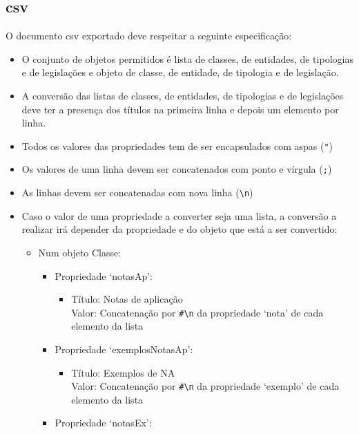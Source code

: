 \subsection{\acrshort{csv}}

O documento \acrshort{csv} exportado deve respeitar a seguinte especificação:
\begin{itemize}
    \item O conjunto de objetos permitidos é lista de classes, de entidades, de tipologias e de legislações e objeto de classe, de entidade, de tipologia e de legislação.
    \item A conversão das listas de classes, de entidades, de tipologias e de legislações deve ter a presença dos títulos na primeira linha e depois um elemento por linha.
    \item Todos os valores das propriedades tem de ser encapsulados com aspas (\verb|"|)
    \item Os valores de uma linha devem ser concatenados com ponto e vírgula (\verb|;|)
    \item As linhas devem ser concatenadas com nova linha (\verb|\n|)
    \item Caso o valor de uma propriedade a converter seja uma lista, a conversão a realizar irá depender da propriedade e do objeto que está a ser convertido: 
    \begin{itemize}
        \item Num objeto Classe:
        \begin{itemize}
            \item Propriedade `notasAp':
            \begin{itemize}
                \item Título: Notas de aplicação \\
                      Valor: Concatenação por \verb|#\n| da propriedade `nota' de cada elemento da lista
            \end{itemize}
            \item Propriedade `exemplosNotasAp':
            \begin{itemize}
                \item Título: Exemplos de NA \\
                      Valor: Concatenação por \verb|#\n| da propriedade `exemplo' de cada elemento da lista
            \end{itemize}
            \item Propriedade `notasEx':
            \begin{itemize}

\end{itemize}
\end{itemize}
\end{itemize}
\end{itemize}
